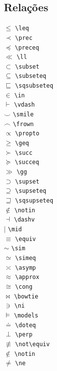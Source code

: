 \documentclass[xindy,rascunho]{fei}
\begin{document}
\begin{teorema}
\section{Relações}
\begin{multicols}{3}
\noindent
\(\leq\) \verb+\leq+\\
\(\prec\) \verb+\prec+\\
\(\preceq\) \verb+\preceq+\\
\(\ll\) \verb+\ll+\\
\(\subset\) \verb+\subset+\\
\(\subseteq\) \verb+\subseteq+\\
\(\sqsubseteq\) \verb+\sqsubseteq+\\
\(\in\) \verb+\in+\\
\(\vdash\) \verb+\vdash+\\
\(\smile\) \verb+\smile+\\
\(\frown\) \verb+\frown+\\
\(\propto\) \verb+\propto+\\
\(\geq\) \verb+\geq+\\
\(\succ\) \verb+\succ+\\
\(\succeq\) \verb+\succeq+\\
\(\gg\) \verb+\gg+\\
\(\supset\) \verb+\supset+\\
\(\supseteq\) \verb+\supseteq+\\
\(\sqsupseteq\) \verb+\sqsupseteq+\\
\(\notin\) \verb+\notin+\\
\(\dashv\) \verb+\dashv+\\
\(\mid\) \verb+\mid+\\
\(\equiv\) \verb+\equiv+\\
\(\sim\) \verb+\sim+\\
\(\simeq\) \verb+\simeq+\\
\(\asymp\) \verb+\asymp+\\
\(\approx\) \verb+\approx+\\
\(\cong\) \verb+\cong+\\
\(\bowtie\) \verb+\bowtie+\\
\(\ni\) \verb+\ni+\\
\(\models\) \verb+\models+\\
\(\doteq\) \verb+\doteq+\\
\(\perp\) \verb+\perp+\\
\(\not\equiv\) \verb+\not\equiv+\\
\(\notin\) \verb+\notin+\\
\(\ne\) \verb+\ne+\\
\end{multicols}


\end{teorema}
\end{document}
